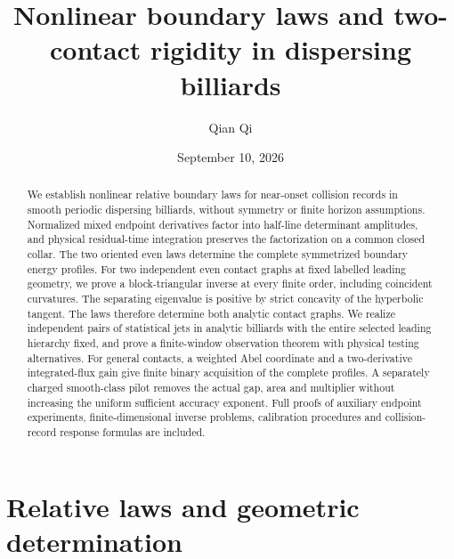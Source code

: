 
\title[Nonlinear boundary laws and two-contact rigidity]{Nonlinear boundary laws and two-contact rigidity
in dispersing billiards}
\author{Qian Qi}
\date{September 10, 2026}

\begin{abstract}
We establish nonlinear relative boundary laws for near-onset collision
records in smooth periodic dispersing billiards, without symmetry or
finite horizon assumptions. Normalized mixed endpoint derivatives
factor into half-line determinant amplitudes, and physical
residual-time integration preserves the factorization on a common
closed collar. The two oriented even laws determine the complete
symmetrized boundary energy profiles. For two independent even
contact graphs at fixed labelled leading geometry, we prove a
block-triangular inverse at every finite order, including coincident
curvatures. The separating eigenvalue is positive by strict concavity
of the hyperbolic tangent. The laws therefore determine both analytic
contact graphs. We realize independent pairs of statistical jets in
analytic billiards with the entire selected leading hierarchy fixed,
and prove a finite-window observation theorem with physical testing
alternatives. For general contacts, a weighted Abel coordinate and
a two-derivative integrated-flux gain give finite binary acquisition
of the complete profiles. A separately charged smooth-class pilot
removes the actual gap, area and multiplier without increasing the
uniform sufficient accuracy exponent. Full proofs of auxiliary
endpoint experiments, finite-dimensional inverse problems, calibration
procedures and collision-record response formulas are included.
\end{abstract}
\maketitle

\part{Relative laws and geometric determination}










